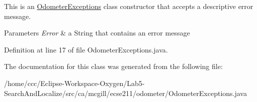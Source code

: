 This is an \hyperlink{classca_1_1mcgill_1_1ecse211_1_1odometer_1_1_odometer_exceptions}{Odometer\+Exceptions} class constructor that accepts a descriptive error message.


\begin{DoxyParams}{Parameters}
{\em Error} & a String that contains an error message \\
\hline
\end{DoxyParams}


Definition at line 17 of file Odometer\+Exceptions.\+java.



The documentation for this class was generated from the following file\+:\begin{DoxyCompactItemize}
\item 
/home/ccc/\+Eclipse-\/\+Workspace-\/\+Oxygen/\+Lab5-\/\+Search\+And\+Localize/src/ca/mcgill/ecse211/odometer/Odometer\+Exceptions.\+java\end{DoxyCompactItemize}
